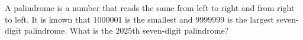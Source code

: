 A palindrome is a number that reads the same from left to right and from right to left. It is known that $1000001$ is the smallest and $9999999$ is the largest seven-digit palindrome. What is the $2025$th seven-digit palindrome?

